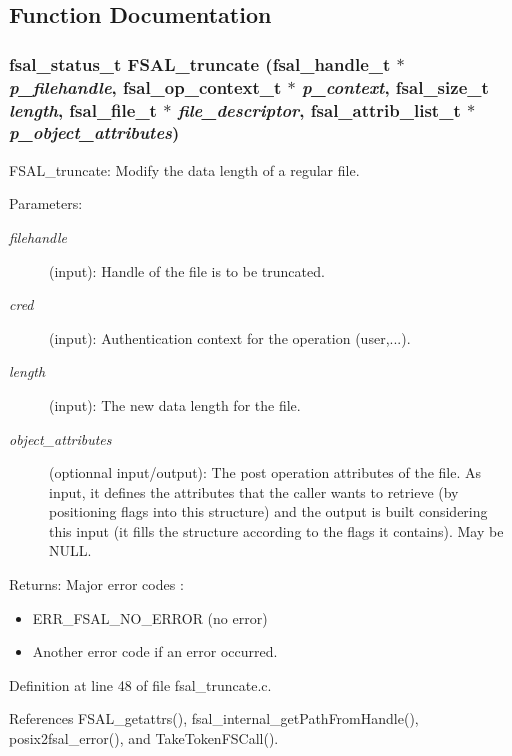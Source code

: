 \subsection{Function Documentation}
\subsubsection[{FSAL\_\-truncate}]{\setlength{\rightskip}{0pt plus 5cm}fsal\_\-status\_\-t FSAL\_\-truncate (fsal\_\-handle\_\-t $\ast$ {\em p\_\-filehandle}, \/  fsal\_\-op\_\-context\_\-t $\ast$ {\em p\_\-context}, \/  fsal\_\-size\_\-t {\em length}, \/  fsal\_\-file\_\-t $\ast$ {\em file\_\-descriptor}, \/  fsal\_\-attrib\_\-list\_\-t $\ast$ {\em p\_\-object\_\-attributes})}\label{fsal__truncate_8c_a3135c9d6a7637a1f583bd2752dd259e}


FSAL\_\-truncate: Modify the data length of a regular file.

\begin{Desc}
\item[Parameters:]
\begin{description}
\item[{\em filehandle}](input): Handle of the file is to be truncated. \item[{\em cred}](input): Authentication context for the operation (user,...). \item[{\em length}](input): The new data length for the file. \item[{\em object\_\-attributes}](optionnal input/output): The post operation attributes of the file. As input, it defines the attributes that the caller wants to retrieve (by positioning flags into this structure) and the output is built considering this input (it fills the structure according to the flags it contains). May be NULL.\end{description}
\end{Desc}
\begin{Desc}
\item[Returns:]Major error codes :\begin{itemize}
\item ERR\_\-FSAL\_\-NO\_\-ERROR (no error)\item Another error code if an error occurred. \end{itemize}
\end{Desc}


Definition at line 48 of file fsal\_\-truncate.c.

References FSAL\_\-getattrs(), fsal\_\-internal\_\-getPathFromHandle(), posix2fsal\_\-error(), and TakeTokenFSCall().